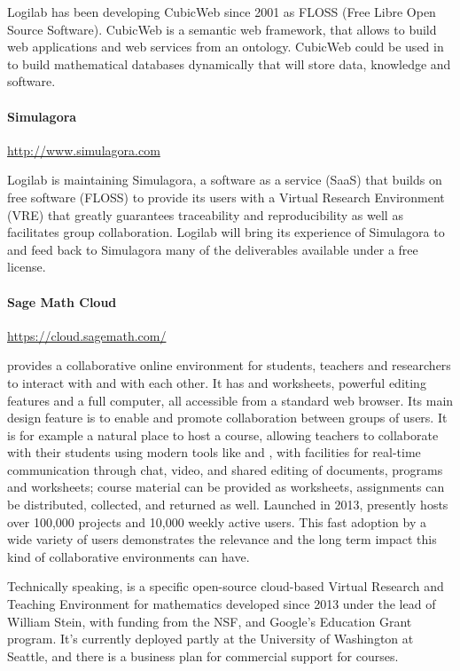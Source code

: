 Logilab has been developing CubicWeb since 2001 as FLOSS (Free Libre Open
Source Software). CubicWeb is a semantic web framework, that allows to
build web applications and web services from an ontology. CubicWeb
could be used in \TheProject to build mathematical databases dynamically
that will store data, knowledge and software.

\paragraph{Simulagora} \url{http://www.simulagora.com}

Logilab is maintaining Simulagora, a software as a service (SaaS) that builds
on free software (FLOSS) to provide its users with a Virtual Research Environment
(VRE) that greatly guarantees traceability and reproducibility as well as
facilitates group collaboration. Logilab will bring its experience of Simulagora
to \TheProject and feed back to Simulagora many of the deliverables available
under a free license.

\paragraph{Sage Math Cloud} \url{https://cloud.sagemath.com/}

\SMC provides a collaborative online environment for students,
teachers and researchers to interact with \Sage and with each
other. It has \Sage and \IPython worksheets, powerful \LATEX editing
features and a full \Linux computer, all accessible from a standard
web browser. Its main design feature is to enable and promote
collaboration between groups of users. It is for example a natural
place to host a course, allowing teachers to collaborate with their
students using modern tools like \Sage and \LATEX, with facilities for
real-time communication through chat, video, and shared editing of
documents, programs and worksheets; course material can be provided as
worksheets, assignments can be distributed, collected, and returned as
well. Launched in 2013, \SMC presently hosts over 100,000 projects and
10,000 weekly active users. This fast adoption by a wide variety of
users demonstrates the relevance and the long term impact this kind of
collaborative environments can have.

Technically speaking, \SMC is a specific open-source cloud-based
Virtual Research and Teaching Environment for mathematics developed
since 2013 under the lead of William Stein, with funding from the NSF,
and Google's Education Grant program.
It's currently deployed partly at the University of Washington at
Seattle, and there is a business plan for commercial support for
courses.


